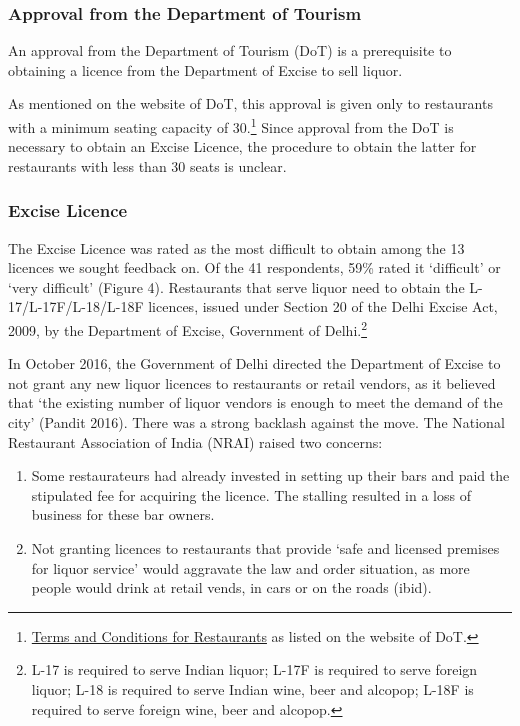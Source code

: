 \documentclass[a4paper, 12pt]{article}
\begin{document}
		\subsubsection{Approval from the Department of Tourism}
		An approval from the Department of Tourism (DoT) is a prerequisite to obtaining a licence from the Department of Excise to sell liquor.
		
		As mentioned on the website of DoT, this approval is given only to restaurants with a minimum seating capacity of 30.\footnote{\href{https://bit.ly/2NMdccI}{Terms and Conditions for Restaurants} as listed on the website of DoT.}  Since approval from the 
DoT is necessary to obtain an Excise Licence, the procedure to obtain the latter for restaurants with less than 30 seats is unclear. %
		
		
		\subsubsection{Excise Licence}
		The Excise Licence was rated as the most difficult to obtain among the 13 licences we sought feedback on. Of the 41 respondents, 59\% rated it ‘difficult’ or ‘very difficult’ (Figure 4). Restaurants that serve liquor need to obtain the L-17/L-17F/L-18/L-18F 
licences, issued under Section 20 of the Delhi Excise Act, 2009, by the Department of Excise, Government of Delhi.\footnote{L-17 is required to serve Indian liquor; L-17F is required to serve foreign liquor; L-18 is required to serve Indian wine, beer and alcopop; 
L-18F is required to serve foreign wine, beer and alcopop.} %
		
		In October 2016, the Government of Delhi directed the Department of Excise to not grant any new liquor licences to restaurants or retail vendors, as it believed that ‘the existing number of liquor vendors is enough to meet the demand of the city’ (Pandit 
2016). There was a strong backlash against the move. The National Restaurant Association of India (NRAI) raised two concerns:
		
		\begin {enumerate}
			\item Some restaurateurs had already invested in setting up their bars and paid the stipulated fee for acquiring the licence. The stalling resulted in a loss of business for these bar owners.
			\item Not granting licences to restaurants that provide ‘safe and licensed premises for liquor service’ would aggravate the law and order situation, as more people would drink at retail vends, in cars or on the roads (ibid).
		\end {enumerate}
		
\end{document}
